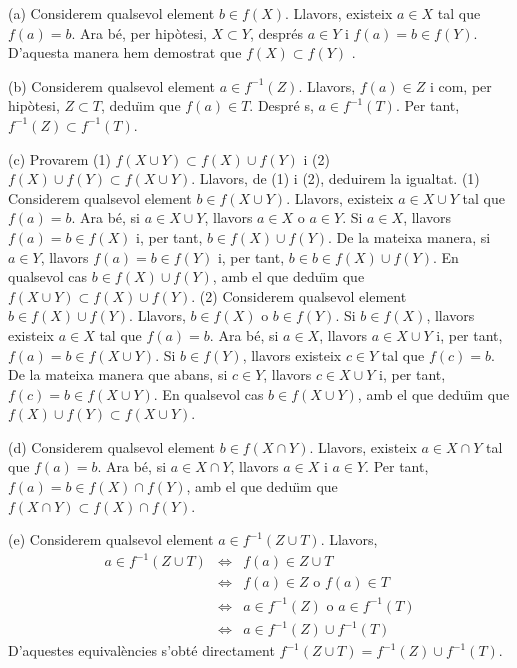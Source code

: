 \begin{solucio}
(a) Considerem qualsevol element $b\in f(X)$. Llavors, existeix $a\in X$ tal
que $f(a)=b$. Ara b\'{e}, per hip\`{o}tesi, $X\subset Y$, despr\'{e}s $a\in
Y $ i $f(a)=b\in f(Y)$. D'aquesta manera hem demostrat que $f(X)\subset f(Y)$%
.

(b) Considerem qualsevol element $a\in f^{-1}(Z)$. Llavors, $f(a)\in Z$ i
com, per hip\`{o}tesi, $Z\subset T$, dedu\"{\i}m que $f(a)\in T$. Despr\'{e}%
s, $a\in f^{-1}(T)$. Per tant, $f^{-1}(Z)\subset f^{-1}(T)$.

(c) Provarem (1) $f(X\cup Y)\subset f(X)\cup f(Y)$ i (2) $f(X)\cup
f(Y)\subset f(X\cup Y)$. Llavors, de (1) i (2), deduirem la igualtat. (1)
Considerem qualsevol element $b\in f(X\cup Y)$. Llavors, existeix $a\in
X\cup Y$ tal que $f(a)=b$. Ara b\'{e}, si $a\in X\cup Y$, llavors $a\in X$ o
$a\in Y$. Si $a\in X$, llavors $f(a)=b\in f(X)$ i, per tant, $b\in f(X)\cup
f(Y)$. De la mateixa manera, si $a\in Y$, llavors $f(a)=b\in f(Y)$ i, per
tant, $b\in b\in f(X)\cup f(Y)$. En qualsevol cas $b\in f(X)\cup f(Y)$, amb
el que dedu\"{\i}m que $f(X\cup Y)\subset f(X)\cup f(Y)$. (2) Considerem
qualsevol element $b\in f(X)\cup f(Y)$. Llavors, $b\in f(X)$ o $b\in f(Y)$.
Si $b\in f(X)$, llavors existeix $a\in X$ tal que $f(a)=b$. Ara b\'{e}, si $%
a\in X$, llavors $a\in X\cup Y$ i, per tant, $f(a)=b\in f(X\cup Y)$. Si $%
b\in f(Y)$, llavors existeix $c\in Y$ tal que $f(c)=b$. De la mateixa manera
que abans, si $c\in Y$, llavors $c\in X\cup Y$ i, per tant, $f(c)=b\in
f(X\cup Y)$. En qualsevol cas $b\in f(X\cup Y)$, amb el que dedu\"{\i}m que $%
f(X)\cup f(Y)\subset f(X\cup Y)$.

(d) Considerem qualsevol element $b\in f(X\cap Y)$. Llavors, existeix $a\in
X\cap Y$ tal que $f(a)=b$. Ara b\'{e}, si $a\in X\cap Y$, llavors $a\in X$ i
$a\in Y$. Per tant, $f(a)=b\in f(X)\cap f(Y)$, amb el que dedu\"{\i}m que $%
f(X\cap Y)\subset f(X)\cap f(Y)$.

(e) Considerem qualsevol element $a\in f^{-1}(Z\cup T)$. Llavors,
\begin{equation*}
\begin{array}{lll}
a\in f^{-1}(Z\cup T) & \Longleftrightarrow & f(a)\in Z\cup T \\
& \Longleftrightarrow & f(a)\in Z\text{ \ o \ }f(a)\in T \\
& \Longleftrightarrow & a\in f^{-1}(Z)\text{ \ o \ }a\in f^{-1}(T) \\
& \Longleftrightarrow & a\in f^{-1}(Z)\cup f^{-1}(T)%
\end{array}%
\end{equation*}%
D'aquestes equival\`{e}ncies s'obt\'{e} directament $f^{-1}(Z\cup
T)=f^{-1}(Z)\cup f^{-1}(T)$.


\end{solucio}
